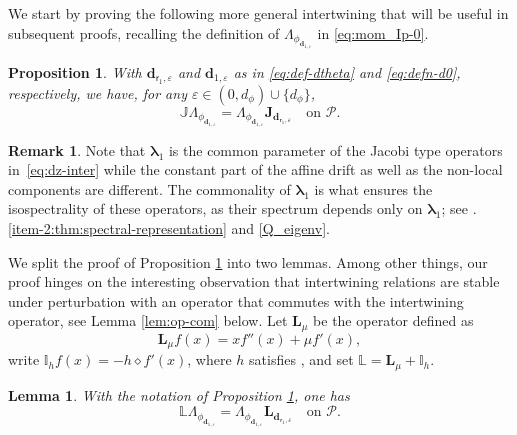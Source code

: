 \documentclass[JEP,XML,SOM,Unicode]{cedram}
\let\epsilon\varepsilon
\theoremstyle{plain}
\newtheorem{lemma}[theorem]{Lemma}
\newtheorem{proposition}[theorem]{Proposition}
\theoremstyle{definition}
\newtheorem{remark}[theorem]{Remark}
\newcommand{\Poly}{\mathscr{P}}
\newcommand{\calI}{\mathds{I}}
\newcommand{\calL}{\mathds{L}}
\newcommand{\calLd}{\mathbf{L}}
\newcommand{\calJ}{\mathds{J}}
\newcommand{\calJd}{\mathbf{J}}
\newcommand{\dpt}{\bm{d}_{\vat,\epsilon}}
\newcommand{\dz}{{\bm{d}}_{1,\epsilon}}
\newcommand{\lam}{{\bm{\lambda}_1}}
\newcommand{\vat}{{\mathsf{r}_1}}
\let\mo\mu
\begin{document}
We start by proving the following more general intertwining that will be useful in subsequent proofs, recalling the definition of $\Lambda_{\phi_{\dz}}$ in \eqref{eq:mom_Ip-0}.

\begin{proposition}
\label{prop:inter_P}
With $\dpt$ and $\dz$ as in \eqref{eq:def-dtheta} and \eqref{eq:defn-d0}, respectively, we have, for any $\epsilon \in (0,d_\phi) \cup \{d_\phi\}$,\vspace*{-3pt}
\begin{equation}
\label{eq:dz-inter}
\calJ \Lambda_{\phi_{\dz}} = \Lambda_{\phi_{\dz}} \calJd_{\dpt} \quad \text{on } \Poly.
\end{equation}
\end{proposition}

\begin{remark}
Note that $\lam$ is the common parameter of the Jacobi type operators in~\eqref{eq:dz-inter} while the constant part of the affine drift as well as the non-local components are different. The commonality of $\lam$ is what ensures the isospectrality of these operators, as their spectrum depends only on $\lam$; see .\eqref{item-2:thm:spectral-representation} and \eqref{Q_eigenv}.
\end{remark}

We split the proof of Proposition \ref{prop:inter_P} into two lemmas. Among other things, our proof hinges on the interesting observation that intertwining relations are stable under perturbation with an operator that commutes with the intertwining operator, see Lemma \ref{lem:op-com} below. Let $\calLd_\mo$ be the operator defined as\vspace*{-3pt}
\begin{equation}
\label{eq:defL}
\calLd_\mo f(x) = xf''(x) + \mo f'(x),
\end{equation}
write $\calI_h f(x) = - h \diamond f'(x)$, where $h$ satisfies , and set $\calL = \calLd_\mo + \calI_h$.

\begin{lemma} \label{lem:inter} With the notation of Proposition \ref{prop:inter_P}, one has
\begin{equation}
\calL \Lambda_{\phi_{\dz}} = \Lambda_{\phi_{\dz}}\calLd_{\dpt} \quad \mbox{on } \Poly.
\end{equation}
\end{lemma}
\end{document}
